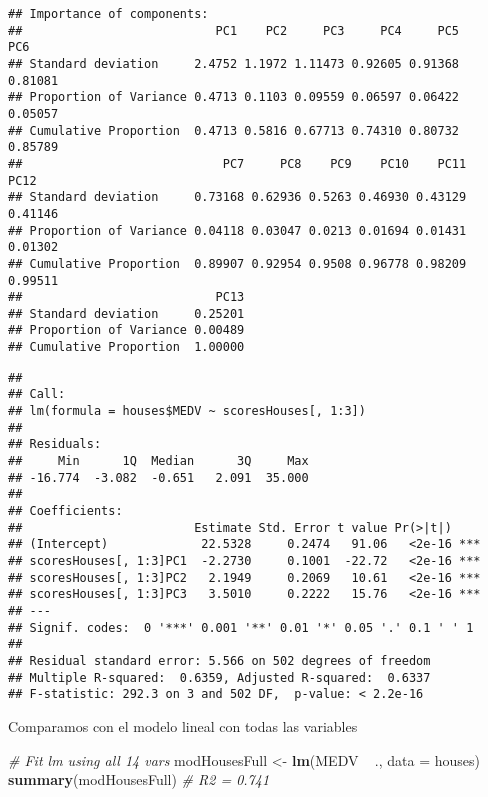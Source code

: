 \documentclass[]{article}
\newenvironment{Shaded}{\begin{snugshade}}{\end{snugshade}}
\newcommand{\KeywordTok}[1]{\textcolor[rgb]{0.13,0.29,0.53}{\textbf{{#1}}}}
\newcommand{\DataTypeTok}[1]{\textcolor[rgb]{0.13,0.29,0.53}{{#1}}}
\newcommand{\DecValTok}[1]{\textcolor[rgb]{0.00,0.00,0.81}{{#1}}}
\newcommand{\StringTok}[1]{\textcolor[rgb]{0.31,0.60,0.02}{{#1}}}
\newcommand{\CommentTok}[1]{\textcolor[rgb]{0.56,0.35,0.01}{\textit{{#1}}}}
\newcommand{\NormalTok}[1]{{#1}}
\numberwithin{equation}{section}
\begin{document}
\begin{verbatim}
## Importance of components:
##                           PC1    PC2     PC3     PC4     PC5     PC6
## Standard deviation     2.4752 1.1972 1.11473 0.92605 0.91368 0.81081
## Proportion of Variance 0.4713 0.1103 0.09559 0.06597 0.06422 0.05057
## Cumulative Proportion  0.4713 0.5816 0.67713 0.74310 0.80732 0.85789
##                            PC7     PC8    PC9    PC10    PC11    PC12
## Standard deviation     0.73168 0.62936 0.5263 0.46930 0.43129 0.41146
## Proportion of Variance 0.04118 0.03047 0.0213 0.01694 0.01431 0.01302
## Cumulative Proportion  0.89907 0.92954 0.9508 0.96778 0.98209 0.99511
##                           PC13
## Standard deviation     0.25201
## Proportion of Variance 0.00489
## Cumulative Proportion  1.00000
\end{verbatim}

\begin{Shaded}
\end{Shaded}

\begin{verbatim}
## 
## Call:
## lm(formula = houses$MEDV ~ scoresHouses[, 1:3])
## 
## Residuals:
##     Min      1Q  Median      3Q     Max 
## -16.774  -3.082  -0.651   2.091  35.000 
## 
## Coefficients:
##                        Estimate Std. Error t value Pr(>|t|)    
## (Intercept)             22.5328     0.2474   91.06   <2e-16 ***
## scoresHouses[, 1:3]PC1  -2.2730     0.1001  -22.72   <2e-16 ***
## scoresHouses[, 1:3]PC2   2.1949     0.2069   10.61   <2e-16 ***
## scoresHouses[, 1:3]PC3   3.5010     0.2222   15.76   <2e-16 ***
## ---
## Signif. codes:  0 '***' 0.001 '**' 0.01 '*' 0.05 '.' 0.1 ' ' 1
## 
## Residual standard error: 5.566 on 502 degrees of freedom
## Multiple R-squared:  0.6359, Adjusted R-squared:  0.6337 
## F-statistic: 292.3 on 3 and 502 DF,  p-value: < 2.2e-16
\end{verbatim}

Comparamos con el modelo lineal con todas las variables

\begin{Shaded}
\begin{Highlighting}[]
\CommentTok{# Fit lm using all 14 vars}
\NormalTok{modHousesFull <-}\StringTok{ }\KeywordTok{lm}\NormalTok{(MEDV ~}\StringTok{ }\NormalTok{., }\DataTypeTok{data =} \NormalTok{houses)}
\KeywordTok{summary}\NormalTok{(modHousesFull) }\CommentTok{# R2 = 0.741}
\end{Highlighting}
\end{Shaded}
\end{document}
